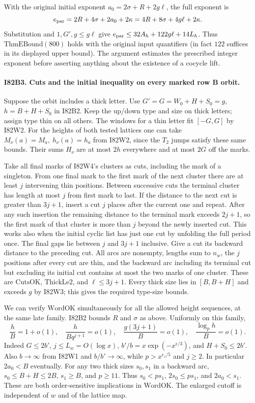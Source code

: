 With the original initial exponent $a_0=2\sigma+R+2g\ell$,
the full exponent is
\[
 e_{\rm par}=2R+4\sigma+2a_0+2\kappa
            =4R+8\sigma+4g\ell+2\kappa .
\]
Substitution and $1,G',g\le g\ell$ give
$e_{\rm par}\le32A_h+122g\ell+14L_h$.
Thus $\mathrm{ThmEBound}(800)$ holds with the original input
quantifiers (in fact $122$ suffices in its displayed upper bound).
The argument estimates the prescribed integer exponent before
asserting anything about the existence of a cocycle lift.

\paragraph{I82B3. Cuts and the initial inequality on every marked row B orbit.}
Suppose the orbit includes a thick letter. Use
$G'=G=W_0+H+S_0=g$, $h=B+H+S_0$ in I82B2. Keep the up/down
type and size on thick letters; assign type thin on all others.
The windows for a thin letter fit $[-G,G]$ by I82W2.
For the heights of both tested lattices one can take
$M_\nu(a)=M_a,\ h_\nu(a)=h_a$ from I82W2, since the $T_2$
jumps satisfy these same bounds. Their sums $H_\nu$ are at most
$2h$ everywhere and at most $2G$ off the marks.

Take all final marks of I82W4's clusters as cuts, including the
mark of a singleton. From one final mark to the first mark of
the next cluster there are at least $j$ intervening thin positions.
Between successive cuts the terminal cluster has length at most
$j$ from first mark to last. If the distance to the next cut is
greater than $3j+1$, insert a cut $j$ places after the current
one and repeat. After any such insertion the remaining distance
to the terminal mark exceeds $2j+1$, so the first mark of that
cluster is more than $j$ beyond the newly inserted cut. This
works also when the initial cyclic list has just one cut by
unfolding the full period once. The final gaps lie between $j$
and $3j+1$ inclusive. Give a cut its backward distance to the
preceding cut. All arcs are nonempty, lengths sum to $n_w$,
the $j$ positions after every cut are thin, and the backward arc
including its terminal cut but excluding its initial cut contains
at most the two marks of one cluster. These are $\mathrm{CutsOK}$,
$\mathrm{ThickLe2}$, and $\ell\le3j+1$.
Every thick size lies in $[B,B+H]$ and exceeds $g$ by I82W3;
this gives the required type-size bounds.

We can verify $\mathrm{WordOK}$ simultaneously for all the
allowed height sequences, at the same late family. I82B2 bounds
$R$ and $\sigma$ as above. Uniformly on this family,
\[
  \frac{h}{B}=1+o(1),\quad
  \frac{h}{Bq^{j+1}}=o(1),\quad
  \frac{g(3j+1)}B=o(1),\quad \frac{\log_p h}{B}=o(1).
\]
Indeed $G\le2b'$, $j\le L_w=O(\log x)$,
$b'/b=x\exp(-x^{\epsilon/3})$, and $H+S_0\le2b'$.
Also $b\to\infty$ from I82W1 and $b/b'\to\infty$, while
$p>x^{\epsilon_z/5}$ and $j\ge2$. In particular $2a_0<B$
eventually. For any two thick sizes $s_0,s_1$ in a backward
arc, $s_0\le B+H\le 2B$, $s_1\ge B$, and $p\ge11$. Thus
$s_0<p s_1$, $2s_0\le p s_1$, and $2a_0<s_1$.
These are both order-sensitive implications in $\mathrm{WordOK}$.
The enlarged cutoff is independent of $w$ and of the lattice map.

